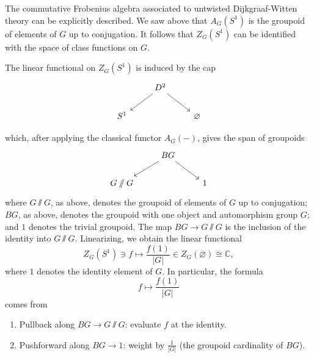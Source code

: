 \documentclass[12pt]{article}
\begin{document}
The commutative Frobenius algebra associated to untwisted Dijkgraaf-Witten theory can be explicitly described. We saw above that $A_G(S^1)$ is the groupoid of elements of $G$ up to conjugation. It follows that $Z_G(S^1)$ can be identified with the space of class functions on $G$. 

\begin{example}[Cap]
The linear functional on $Z_G(S^1)$ is induced by the cap 
\[\begin{tikzcd}
& D^2 \arrow[dl] \arrow[dr] & \\
S^1 & & \varnothing
\end{tikzcd}\]

which, after applying the classical functor $A_G(-)$, gives the span of groupoids
\[
\begin{tikzcd}
& BG \arrow[dl] \arrow[dr] & \\
G\sslash G & & 1
\end{tikzcd}
\]
where $G\sslash G$, as above, denotes the groupoid of elements of $G$ up to conjugation; $BG$, as above, denotes the groupoid with one object and automorphism group $G$; and $1$ denotes the trivial groupoid. The map $BG \to G\sslash G$ is the inclusion of the identity into $G\sslash G$. Linearizing, we obtain the linear functional
\[
Z_G(S^1) \ni f \longmapsto \frac{f(1)}{|G|} \in Z_G(\varnothing) \cong \mathbb{C},
\]
where $1$ denotes the identity element of $G$. In particular, the formula
\[
f \mapsto \frac{f(1)}{|G|}
\]
comes from
\begin{enumerate}
    \item Pullback along \(BG \to G\sslash G\): evaluate $f$ at the identity.
    \item Pushforward along \(BG \to 1\): weight by \(\frac{1}{|G|}\) (the groupoid cardinality of \(BG\)).
\end{enumerate}
\end{example}
\end{document}
